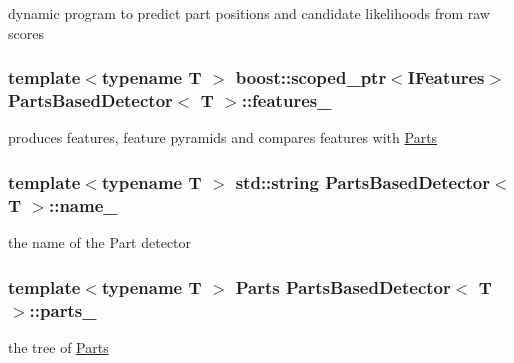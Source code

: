 dynamic program to predict part positions and candidate likelihoods from raw scores 

\hypertarget{classPartsBasedDetector_a6242f9b02fcb1a440cc431f2fc15521f}{
\subsubsection[{features\-\_\-}]{\setlength{\rightskip}{0pt plus 5cm}template$<$typename T $>$ boost\-::scoped\-\_\-ptr$<${\bf I\-Features}$>$ {\bf Parts\-Based\-Detector}$<$ T $>$\-::features\-\_\-\hspace{0.3cm}{\ttfamily [private]}}}\label{classPartsBasedDetector_a6242f9b02fcb1a440cc431f2fc15521f}


produces features, feature pyramids and compares features with \hyperlink{classParts}{Parts} 

\hypertarget{classPartsBasedDetector_a776c766541fb4c2974c6b40a8f4f1c2f}{
\subsubsection[{name\-\_\-}]{\setlength{\rightskip}{0pt plus 5cm}template$<$typename T $>$ std\-::string {\bf Parts\-Based\-Detector}$<$ T $>$\-::name\-\_\-\hspace{0.3cm}{\ttfamily [private]}}}\label{classPartsBasedDetector_a776c766541fb4c2974c6b40a8f4f1c2f}


the name of the Part detector 

\hypertarget{classPartsBasedDetector_ad548ec9214858535eb6a0f3783d11664}{
\subsubsection[{parts\-\_\-}]{\setlength{\rightskip}{0pt plus 5cm}template$<$typename T $>$ {\bf Parts} {\bf Parts\-Based\-Detector}$<$ T $>$\-::parts\-\_\-\hspace{0.3cm}{\ttfamily [private]}}}\label{classPartsBasedDetector_ad548ec9214858535eb6a0f3783d11664}


the tree of \hyperlink{classParts}{Parts} 

